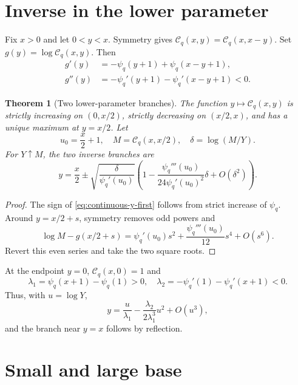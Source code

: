 \documentclass[11pt,a4paper,oneside,openany]{book}
\newtheorem{theorem}{Theorem}[chapter]
\theoremstyle{definition}
\theoremstyle{remark}
\begin{document}
\section{Inverse in the lower parameter}

Fix \(x>0\) and let \(0<y<x\).  Symmetry gives
\(\mathcal C_q(x,y)=\mathcal C_q(x,x-y)\).  Set
\(g(y)=\log\mathcal C_q(x,y)\).  Then
\begin{align}
 g'(y)&=-\psi_q(y+1)+\psi_q(x-y+1),\label{eq:continuous-y-first}\\
 g''(y)&=-\psi_q'(y+1)-\psi_q'(x-y+1)<0.
\label{eq:continuous-y-second}
\end{align}

\begin{theorem}[Two lower-parameter branches]\label{thm:continuous-lower-branches}
The function \(y\mapsto\mathcal C_q(x,y)\) is strictly increasing on
\((0,x/2)\), strictly decreasing on \((x/2,x)\), and has a unique maximum
at \(y=x/2\).  Let
\[
 u_0=\frac x2+1,
 \quad M=\mathcal C_q(x,x/2),
 \quad \delta=\log(M/Y).
\]
For \(Y\uparrow M\), the two inverse branches are
\begin{equation}\label{eq:continuous-lower-puiseux}
 y=\frac x2\pm\sqrt{\frac{\delta}{\psi_q'(u_0)}}
 \left(1-\frac{\psi_q'''(u_0)}{24\psi_q'(u_0)^2}\delta
 +O(\delta^2)\right).
\end{equation}
\end{theorem}

\begin{proof}
The sign of \eqref{eq:continuous-y-first} follows from strict increase of
\(\psi_q\).  Around \(y=x/2+s\), symmetry removes odd powers and
\[
 \log M-g(x/2+s)
 =\psi_q'(u_0)s^2+\frac{\psi_q'''(u_0)}{12}s^4+O(s^6).
\]
Revert this even series and take the two square roots.
\end{proof}

At the endpoint \(y=0\), \(\mathcal C_q(x,0)=1\) and
\[
 \lambda_1=\psi_q(x+1)-\psi_q(1)>0,
 \quad
 \lambda_2=-\psi_q'(1)-\psi_q'(x+1)<0.
\]
Thus, with \(u=\log Y\),
\begin{equation}\label{eq:continuous-y-endpoint-inverse}
 y=\frac{u}{\lambda_1}-\frac{\lambda_2}{2\lambda_1^3}u^2+O(u^3),
\end{equation}
and the branch near \(y=x\) follows by reflection.

\section{Small and large base}
\end{document}
